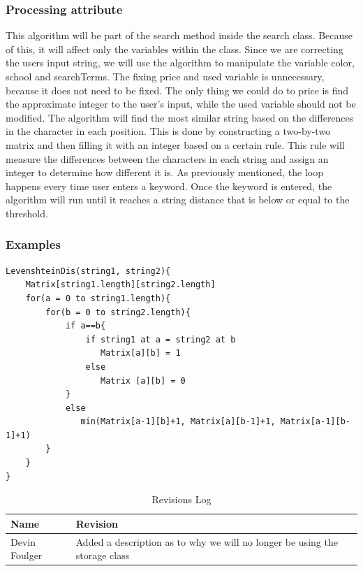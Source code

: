 \documentclass[journal,compsoc, 10pt, draftclsnofoot, onecolumn]{IEEEtran}
\begin{document}
\subsubsection*{Processing attribute}
This algorithm will be part of the search method inside the search class. 
Because of this, it will affect only the variables within the class. 
Since we are correcting the users input string, we will use the algorithm to 
manipulate the variable color, school and searchTerms. The fixing price and used 
variable is unnecessary, because it does not need to be fixed. The only thing 
we could do to price is find the approximate integer to the user's input, while 
the used variable should not be modified. The algorithm will find the most 
similar string based on the differences in the character in each position. 
This is done by constructing a two-by-two matrix and then filling it with an 
integer based on a certain rule. This rule will measure the differences 
between the characters in each string and assign an integer to determine how 
different it is. As previously mentioned, the loop happens every time user 
enters a keyword. Once the keyword is entered, the algorithm will run until 
it reaches a string distance that is below or equal to the threshold.

\subsubsection*{Examples}
\begin{lstlisting}
LevenshteinDis(string1, string2){
	Matrix[string1.length][string2.length]
	for(a = 0 to string1.length){
		for(b = 0 to string2.length){
			if a==b{
				if string1 at a = string2 at b
				   Matrix[a][b] = 1
				else 
				   Matrix [a][b] = 0
			}
			else 
			   min(Matrix[a-1][b]+1, Matrix[a][b-1]+1, Matrix[a-1][b-1]+1)
		}
	}
}
\end{lstlisting}

\newpage
\begin{table}[h]
\centering
\caption{Revisions Log}
\label{my-label}
\begin{tabularx}{\textwidth}{l|X}
\textbf{Name}  & \textbf{Revision} \\ \hline
 Devin Foulger   &   Added a description as to why we will no longer be using the storage class \\ \hline
\end{tabularx}
\end{table}
\end{document}
